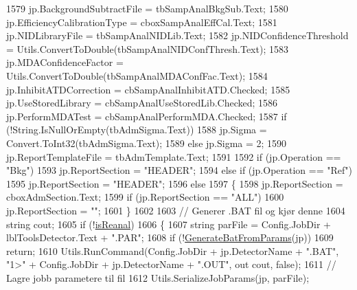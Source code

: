 \begin{DoxyCode}
1579             jp.BackgroundSubtractFile = tbSampAnalBkgSub.Text;
1580             jp.EfficiencyCalibrationType = cboxSampAnalEffCal.Text;
1581             jp.NIDLibraryFile = tbSampAnalNIDLib.Text;
1582             jp.NIDConfidenceThreshold = Utils.ConvertToDouble(tbSampAnalNIDConfThresh.Text);
1583             jp.MDAConfidenceFactor = Utils.ConvertToDouble(tbSampAnalMDAConfFac.Text);
1584             jp.InhibitATDCorrection = cbSampAnalInhibitATD.Checked;
1585             jp.UseStoredLibrary = cbSampAnalUseStoredLib.Checked;
1586             jp.PerformMDATest = cbSampAnalPerformMDA.Checked;
1587             \textcolor{keywordflow}{if} (!String.IsNullOrEmpty(tbAdmSigma.Text))
1588                 jp.Sigma = Convert.ToInt32(tbAdmSigma.Text);
1589             \textcolor{keywordflow}{else} jp.Sigma = 2;
1590             jp.ReportTemplateFile = tbAdmTemplate.Text;
1591 
1592             \textcolor{keywordflow}{if} (jp.Operation == \textcolor{stringliteral}{"Bkg"})
1593                 jp.ReportSection = \textcolor{stringliteral}{"HEADER"};
1594             \textcolor{keywordflow}{else} \textcolor{keywordflow}{if} (jp.Operation == \textcolor{stringliteral}{"Ref"})
1595                 jp.ReportSection = \textcolor{stringliteral}{"HEADER"};
1596             \textcolor{keywordflow}{else}
1597             \{
1598                 jp.ReportSection = cboxAdmSection.Text;
1599                 \textcolor{keywordflow}{if} (jp.ReportSection == \textcolor{stringliteral}{"ALL"})
1600                     jp.ReportSection = \textcolor{stringliteral}{""};
1601             \}
1602 
1603             \textcolor{comment}{// Generer .BAT fil og kjør denne}
1604             \textcolor{keywordtype}{string} cout;
1605             \textcolor{keywordflow}{if} (!\hyperlink{class_scintilab_1_1_form_main_a389e9c6697c567d84058d178053a837c}{isReanal})
1606             \{
1607                 \textcolor{keywordtype}{string} parFile = Config.JobDir + lblToolsDetector.Text + \textcolor{stringliteral}{".PAR"};
1608                 \textcolor{keywordflow}{if} (!\hyperlink{class_scintilab_1_1_form_main_ac34ad4400cb8a7b5d38feca1f620b3cb}{GenerateBatFromParams}(jp))
1609                     \textcolor{keywordflow}{return};
1610                 Utils.RunCommand(Config.JobDir + jp.DetectorName + \textcolor{stringliteral}{".BAT"}, \textcolor{stringliteral}{"1>"} + Config.JobDir + 
      jp.DetectorName + \textcolor{stringliteral}{".OUT"}, out cout, \textcolor{keyword}{false});
1611                 \textcolor{comment}{// Lagre jobb parametere til fil}
1612                 Utils.SerializeJobParams(jp, parFile);

\end{DoxyCode}
